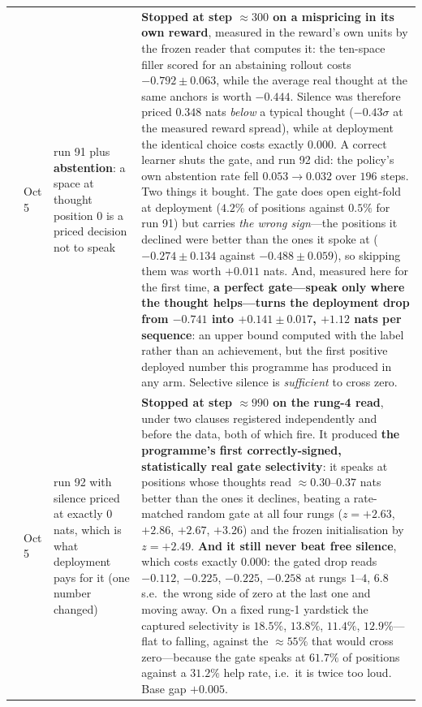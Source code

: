 \documentclass{article} %
\begin{document}
{\begin{longtable}{@{}llp{3.6cm}p{5.6cm}@{}}
\addlinespace
92 & Oct 5 & run 91 plus \textbf{abstention}: a space at thought position $0$ is a priced decision not to speak & \textbf{Stopped at step ${\approx}300$ on a mispricing in its own reward}, measured in the reward's own units by the frozen reader that computes it: the ten-space filler scored for an abstaining rollout costs $-0.792 \pm 0.063$, while the average real thought at the same anchors is worth $-0.444$. Silence was therefore priced $0.348$ nats \emph{below} a typical thought ($-0.43\sigma$ at the measured reward spread), while at deployment the identical choice costs exactly $0.000$. A correct learner shuts the gate, and run 92 did: the policy's own abstention rate fell $0.053 \to 0.032$ over $196$ steps. Two things it bought. The gate does open eight-fold at deployment ($4.2\%$ of positions against $0.5\%$ for run 91) but carries \emph{the wrong sign}---the positions it declined were better than the ones it spoke at ($-0.274 \pm 0.134$ against $-0.488 \pm 0.059$), so skipping them was worth $+0.011$ nats. And, measured here for the first time, \textbf{a perfect gate---speak only where the thought helps---turns the deployment drop from $-0.741$ into $+0.141 \pm 0.017$, $+1.12$ nats per sequence}: an upper bound computed with the label rather than an achievement, but the first positive deployed number this programme has produced in any arm. Selective silence is \emph{sufficient} to cross zero. \\
\addlinespace
93 & Oct 5 & run 92 with silence priced at exactly $0$ nats, which is what deployment pays for it (one number changed) & \textbf{Stopped at step ${\approx}990$ on the rung-4 read}, under two clauses registered independently and before the data, both of which fire. It produced \textbf{the programme's first correctly-signed, statistically real gate selectivity}: it speaks at positions whose thoughts read ${\approx}0.30$--$0.37$ nats better than the ones it declines, beating a rate-matched random gate at all four rungs ($z = +2.63$, $+2.86$, $+2.67$, $+3.26$) and the frozen initialisation by $z = +2.49$. \textbf{And it still never beat free silence}, which costs exactly $0.000$: the gated drop reads $-0.112$, $-0.225$, $-0.225$, $-0.258$ at rungs $1$--$4$, $6.8$ s.e.\ the wrong side of zero at the last one and moving away. On a fixed rung-1 yardstick the captured selectivity is $18.5\%$, $13.8\%$, $11.4\%$, $12.9\%$---flat to falling, against the ${\approx}55\%$ that would cross zero---because the gate speaks at $61.7\%$ of positions against a $31.2\%$ help rate, i.e.\ it is twice too loud. Base gap $+0.005$. \\

\end{longtable}}
\end{document}
